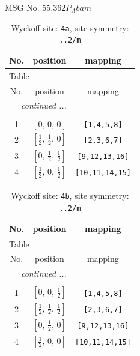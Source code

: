 \documentclass[fleqn,8pt]{jsarticle}
\begin{document}
\setcounter{MaxMatrixCols}{32}

\renewcommand{\tablename}{Table~}
\renewcommand{\figurename}{Figure~}
\begin{center}
\LARGE
MSG No. 55.362\quad$P_{A}bam$
\end{center}
\renewcommand{\arraystretch}{1.2}
\begin{longtable}{ccc}
\caption{Wyckoff site: {\tt 4a}, site symmetry: {\tt ..2/m}}
 \\
 \hline \hline
No. & position & mapping \\ \hline \endfirsthead

\multicolumn{2}{l}{\tablename\ \thetable{}} \\
 \hline \hline
No. & position & mapping \\ \hline \endhead

 \hline \hline
\multicolumn{2}{r}{\footnotesize\it continued ...} \\ \endfoot

 \hline \hline
\multicolumn{2}{r}{} \\ \endlastfoot

1 & $\left[ 0,\, 0,\, 0 \right]$ & {\tt [1,4,5,8]} \\ \hline
2 & $\left[ \frac{1}{2},\, \frac{1}{2},\, 0 \right]$ & {\tt [2,3,6,7]} \\ \hline
3 & $\left[ 0,\, \frac{1}{2},\, \frac{1}{2} \right]$ & {\tt [9,12,13,16]} \\ \hline
4 & $\left[ \frac{1}{2},\, 0,\, \frac{1}{2} \right]$ & {\tt [10,11,14,15]} \\
\end{longtable}
\renewcommand{\arraystretch}{1.2}
\begin{longtable}{ccc}
\caption{Wyckoff site: {\tt 4b}, site symmetry: {\tt ..2/m}}
 \\
 \hline \hline
No. & position & mapping \\ \hline \endfirsthead

\multicolumn{2}{l}{\tablename\ \thetable{}} \\
 \hline \hline
No. & position & mapping \\ \hline \endhead

 \hline \hline
\multicolumn{2}{r}{\footnotesize\it continued ...} \\ \endfoot

 \hline \hline
\multicolumn{2}{r}{} \\ \endlastfoot

1 & $\left[ 0,\, 0,\, \frac{1}{2} \right]$ & {\tt [1,4,5,8]} \\ \hline
2 & $\left[ \frac{1}{2},\, \frac{1}{2},\, \frac{1}{2} \right]$ & {\tt [2,3,6,7]} \\ \hline
3 & $\left[ 0,\, \frac{1}{2},\, 0 \right]$ & {\tt [9,12,13,16]} \\ \hline
4 & $\left[ \frac{1}{2},\, 0,\, 0 \right]$ & {\tt [10,11,14,15]} \\
\end{longtable}
\end{document}
